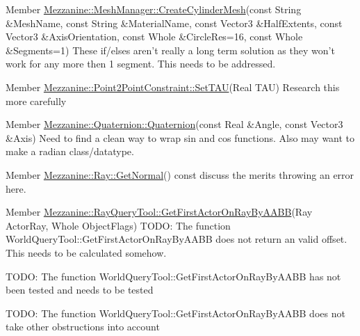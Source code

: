 \label{todo__todo000016}
\hypertarget{todo__todo000016}{}
 
\begin{DoxyDescription}
\item[Member \hyperlink{classMezzanine_1_1MeshManager_a6de2e01b43302a9439dc01c1dcc90f4c}{Mezzanine::MeshManager::CreateCylinderMesh}(const String \&MeshName, const String \&MaterialName, const Vector3 \&HalfExtents, const Vector3 \&AxisOrientation, const Whole \&CircleRes=16, const Whole \&Segments=1) ]These if/elses aren't really a long term solution as they won't work for any more then 1 segment. This needs to be addressed. 
\end{DoxyDescription}

\label{todo__todo000007}
\hypertarget{todo__todo000007}{}
 
\begin{DoxyDescription}
\item[Member \hyperlink{classMezzanine_1_1Point2PointConstraint_a9eba349fe0f12483330b9c309e305168}{Mezzanine::Point2PointConstraint::SetTAU}(Real TAU) ]Research this more carefully 
\end{DoxyDescription}

\label{todo__todo000017}
\hypertarget{todo__todo000017}{}
 
\begin{DoxyDescription}
\item[Member \hyperlink{classMezzanine_1_1Quaternion_a86a46d0ce78a6ce83cc40ed2d03349d4}{Mezzanine::Quaternion::Quaternion}(const Real \&Angle, const Vector3 \&Axis) ]Need to find a clean way to wrap sin and cos functions. Also may want to make a radian class/datatype. 
\end{DoxyDescription}

\label{todo__todo000018}
\hypertarget{todo__todo000018}{}
 
\begin{DoxyDescription}
\item[Member \hyperlink{classMezzanine_1_1Ray_a7164d929caf75bcebceed9149e9a3540}{Mezzanine::Ray::GetNormal}() const  ]discuss the merits throwing an error here. 
\end{DoxyDescription}

\label{todo__todo000019}
\hypertarget{todo__todo000019}{}
 
\begin{DoxyDescription}
\item[Member \hyperlink{classMezzanine_1_1RayQueryTool_a9ded1647755a523d3dbda297a0e73eba}{Mezzanine::RayQueryTool::GetFirstActorOnRayByAABB}(Ray ActorRay, Whole ObjectFlags) ]TODO: The function WorldQueryTool::GetFirstActorOnRayByAABB does not return an valid offset. This needs to be calculated somehow. 

TODO: The function WorldQueryTool::GetFirstActorOnRayByAABB has not been tested and needs to be tested 

TODO: The function WorldQueryTool::GetFirstActorOnRayByAABB does not take other obstructions into account 
\end{DoxyDescription}

